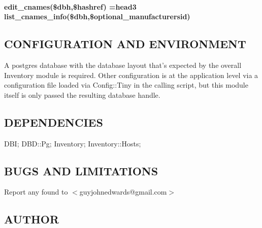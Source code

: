 \documentclass{book}
\begin{document}
\paragraph*{edit\protect\_cnames(\$dbh,\$hashref) =head3 list\protect\_cnames\protect\_info(\$dbh,\$optional\protect\_manufacturersid)}
\label{Inventory::Cnames_edit_cnames_dbh_hashref_head3_list_cnames_info_dbh_optional_manufacturersid_}
\hypertarget{Inventory::Cnames_edit_cnames_dbh_hashref_head3_list_cnames_info_dbh_optional_manufacturersid_}{}


\subsection{CONFIGURATION AND ENVIRONMENT}
\label{Inventory::Cnames_CONFIGURATION_AND_ENVIRONMENT}
\hypertarget{Inventory::Cnames_CONFIGURATION_AND_ENVIRONMENT}{}



A postgres database with the database layout that's expected by the overall Inventory module is required. Other configuration is at the application level via a configuration file loaded via Config::Tiny in the calling script, but this module itself is only passed the resulting database handle.


\subsection{DEPENDENCIES}
\label{Inventory::Cnames_DEPENDENCIES}
\hypertarget{Inventory::Cnames_DEPENDENCIES}{}



DBI; DBD::Pg; Inventory; Inventory::Hosts;


\subsection{BUGS AND LIMITATIONS}
\label{Inventory::Cnames_BUGS_AND_LIMITATIONS}
\hypertarget{Inventory::Cnames_BUGS_AND_LIMITATIONS}{}



Report any found to $<$guyjohnedwards@gmail.com$>$


\subsection{AUTHOR}
\label{Inventory::Cnames_AUTHOR}
\hypertarget{Inventory::Cnames_AUTHOR}{}
\end{document}
